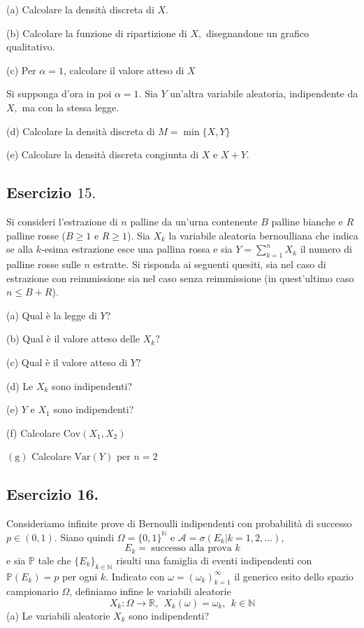(a) Calcolare la densità discreta di $X$.

(b) Calcolare la funzione di ripartizione di $X,$ disegnandone un grafico qualitativo.

(c) Per $\alpha =1$, calcolare il valore atteso di $X$

Si supponga d'ora in poi $\alpha =1.$ Sia $Y$ un'altra variabile aleatoria, indipendente da $X,$ ma con la stessa legge.

(d) Calcolare la densità discreta di $M=\min \{X,Y\}$

(e) Calcolare la densità discreta congiunta di $X$ e $X+Y$.
\subsection{Esercizio $15.$}

Si consideri l'estrazione di $n$ palline da un'urna contenente $B$ palline bianche e $R$ palline rosse ($B\geq 1$ e $R\geq 1$). Sia $X_{k}$ la variabile aleatoria bernoulliana che indica se alla $k$-esima estrazione esce una pallina rossa e sia $Y=\sum _{k=1}^{n} X_{k}$ il numero di palline rosse sulle $n$ estratte. Si risponda ai seguenti quesiti, sia nel caso di estrazione con reimmissione sia nel caso senza reimmissione (in quest'ultimo caso $n\leq B+R$).

(a) Qual è la legge di $Y$?

(b) Qual è il valore atteso delle $X_{k} ?$

(c) Qual è il valore atteso di $Y?$

(d) Le $X_{k}$ sono indipendenti?

(e) $Y$ e $X_{1}$ sono indipendenti?

(f) Calcolare $\mathrm{Cov}( X_{1} ,X_{2})$

$(\mathrm{g} )$ Calcolare $\mathrm{Var} (Y)$ per $n=2$
\subsection{Esercizio 16.}

Consideriamo infinite prove di Bernoulli indipendenti con probabilità di successo $p\in (0,1)$. Siano quindi $\Omega =\{0,1\}^{\mathbb{N}}$ e $\mathcal{A} =\sigma ( E_{k} |k=1,2,\dotsc )$,
\begin{equation*}
E_{k} =\ \text{successo alla prova } k
\end{equation*}
e sia $\mathbb{P}$ tale che $\{E_{k}\}_{k\in \mathbb{N}}$ risulti una famiglia di eventi indipendenti con $\mathbb{P}( E_{k}) =p$ per ogni $k$. Indicato con $\omega =( \omega _{k})_{k=1}^{\infty }$ il generico esito dello spazio campionario $\Omega $, definiamo infine le variabili aleatorie
\begin{equation*}
X_{k} :\Omega \rightarrow \mathbb{R} ,\ \ X_{k} (\omega )=\omega _{k} ,\ \ k\in \mathbb{N}
\end{equation*}
(a) Le variabili aleatorie $X_{k}$ sono indipendenti?

